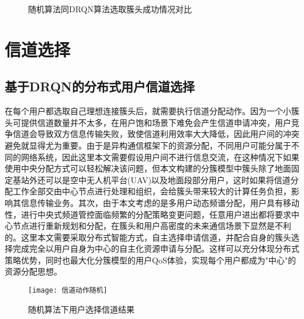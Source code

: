 \begin{figure}[htbp]
	\begin{minipage}{\textwidth}
		\centering
		\subfigure{\label{fig:簇头奖励DRQN}}\addtocounter{subfigure}{-2}
		\hspace{1em}
		\subfigure{\label{fig:簇头奖励random}}\addtocounter{subfigure}{-2}
		\hspace{1em}	
	\end{minipage}
	\vspace{0.2em}
	\caption{随机算法同DRQN算法选取簇头成功情况对比}\label{fig:簇头奖励对比}
\end{figure}


\section{信道选择}
\subsection{基于DRQN的分布式用户信道选择}
在每个用户都选取自己理想连接簇头后，就需要执行信道分配动作。因为一个小簇头可提供信道数量并不太多，在用户饱和场景下难免会产生信道申请冲突，用户竞争信道会导致双方信息传输失败，致使信道利用效率大大降低，因此用户间的冲突避免就显得尤为重要。由于是异构通信框架下的资源分配，不同用户可能分属于不同的网络系统，因此这里本文需要假设用户间不进行信息交流，在这种情况下如果使用中央分配方式可以轻松解决该问题，但本文构建的分簇模型中簇头除了地面固定基站外还可以是空中无人机平台(UAV)以及地面段部分用户，这时如果将信道分配工作全部交由中心节点进行处理和组织，会给簇头带来较大的计算任务负担，影响其信息传输业务。其次，由于本文考虑的是多用户动态频谱分配，用户具有移动性，进行中央式频道管控面临频繁的分配策略变更问题，任意用户进出都将要求中心节点进行重新规划和分配，在簇头和用户高密度的未来通信场景下显然是不利的。这里本文需要采取分布式智能方式，自主选择申请信道，并配合自身的簇头选择完成完全以用户自身为中心的自主化资源申请与分配。这样可以充分体现分布式策略优势，同时也最大化分簇模型的用户QoS体验，实现每个用户都成为"中心"的资源分配思想。
\begin{figure}[htbp]
	\centering
	\texttt{[image: 信道动作随机]}
	\caption{随机算法下用户选择信道结果}
	\label{fig:信道随机动作}
\end{figure}

